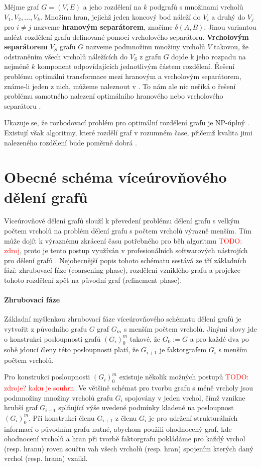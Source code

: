 \documentclass[11pt,american,czech,oneside]{book}
\theoremstyle{plain}
\theoremstyle{definition}
\newcommand{\TODO}[1]{\textcolor{red}{TODO: #1}}
\begin{document}
Mějme graf $G=(V,E)$ a jeho rozdělení na $k$ podgrafů s množinami vrcholů $V_1, V_2, \ldots, V_k$. Množinu hran, jejichž jeden koncový bod náleží do $V_i$ a druhý do $V_j$ pro $i \neq j$ nazveme \textbf{hranovým separátorem}, značíme $\delta(A,B)$. Jinou variantou nalézt rozdělení grafu definované pomocí vrcholového separátoru.
\textbf{Vrcholovým separátorem} $V_S$ grafu $G$ nazveme podmnožinu množiny vrcholů $V$ takovou, že odstraněním všech vrcholů náležících do $V_S$ z grafu $G$ dojde k jeho rozpadu na nejméně $k$ komponent odpovídajících jednotlivým částem rozdělení. Řešení problému optimální transformace mezi hranovým a vrcholovým separátorem, známe-li jeden z nich, můžeme naleznout v \cite{pofa:90}. To nám ale nic neříká o řešení problému samotného nalezení optimálního hranového nebo vrcholového separátoru \cite{liu:89}.

Ukazuje se, že rozhodovací problém pro optimální rozdělení grafu je NP-úplný \cite{gajo:79}. Existují však algoritmy, které rozdělí graf v rozumném čase, přičemž kvalita jimi nalezeného rozdělení bude poměrně dobrá \cite{lita:79}.

\section{Obecné schéma víceúrovňového dělení grafů}
\label{multilevel}

Víceúrovňové dělení grafů slouží k převedení problému dělení grafu s velkým počtem vrcholů na problém dělení grafu s počtem vrcholů výrazně menším. Tím může dojít k výraznému zkrácení času potřebného pro běh algoritmu \TODO{zdroj}, proto je tento postup využíván v profesionálních softwarových nástrojích pro dělení grafů \cite{lehe:95, kary:13}. Nejobecnější popis tohoto schématu sestává ze tří základních fází: zhrubovací fáze (coarsening phase), rozdělení vzniklého grafu a projekce tohoto rozdělení zpět na původní graf (refinement phase).

\paragraph{Zhrubovací fáze}
Základní myšlenkou zhrubovací fáze víceúrovňového schématu dělení grafů je vytvořit z původního grafu $G$ graf $G_m$ s menším počtem vrcholů. Jinými slovy jde o konstrukci posloupnosti grafů $(G_i)_0^m$ takové, že $G_0 := G$ a pro každé dva po sobě jdoucí členy této posloupnosti platí, že $G_{i+1}$ je faktorgrafem $G_i$ s menším počtem vrcholů. 

Pro konstrukci posloupnosti $(G_i)_0^m$ existuje několik možných postupů \cite{kaku:98} \TODO{zdroje? kaku je souhrn}. Ve většině schémat pro tvorbu grafu s méně vrcholy jsou podmnožiny množiny vrcholů grafu $G_i$ spojovány v jeden vrchol, čímž vznikne hrubší graf $G_{i+1}$ splňující výše uvedené podmínky kladené na posloupnost $(G_i)_0^m$. Při konstrukci členu $G_{i+1}$ z členu $G_i$ je pro udržení strukturálních informací o původním grafu nutné, abychom použili ohodnocený graf, kde ohodnocení vrcholů a hran při tvorbě faktorgrafu pokládáme pro každý vrchol (resp. hranu) roven součtu vah všech vrcholů (resp. hran) spojením kterých daný vrchol (resp. hrana) vznikl. 
\end{document}
